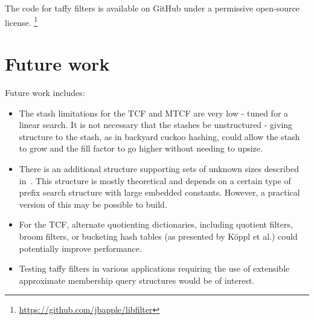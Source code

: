 \documentclass[sigconf]{acmart}
\newcommand{\etal}{et al.}
\begin{document}
The code for taffy filters is available on GitHub under a permissive open-source license.
\ifanon
\else
\footnote{\url{https://github.com/jbapple/libfilter}}
\fi









\section{Future work}
\label{conclusion}

Future work includes:

\begin{itemize}
\item The stash limitations for the TCF and MTCF are very low - tuned for a linear search.
It is not necessary that the stashes be unstructured - giving structure to the stash, as in backyard cuckoo hashing, could allow the stash to grow and the fill factor to go higher without needing to upsize.~\cite{backyard}

\item There is an additional structure supporting sets of unknown sizes described in~\cite{unknown-prefix}.
This structure is mostly theoretical and depends on a certain type of prefix search structure with large embedded constants.
However, a practical version of this may be possible to build.

\item For the TCF, alternate quotienting dictionaries, including quotient filters, broom filters, or bucketing hash tables (as presented by K\"oppl \etal{}) could potentially improve performance.~\cite{raman-practical,broom,quotient-filter}

\item Testing taffy filters in various applications requiring the use of extensible approximate membership query structures would be of interest.
\end{itemize}
\end{document}
